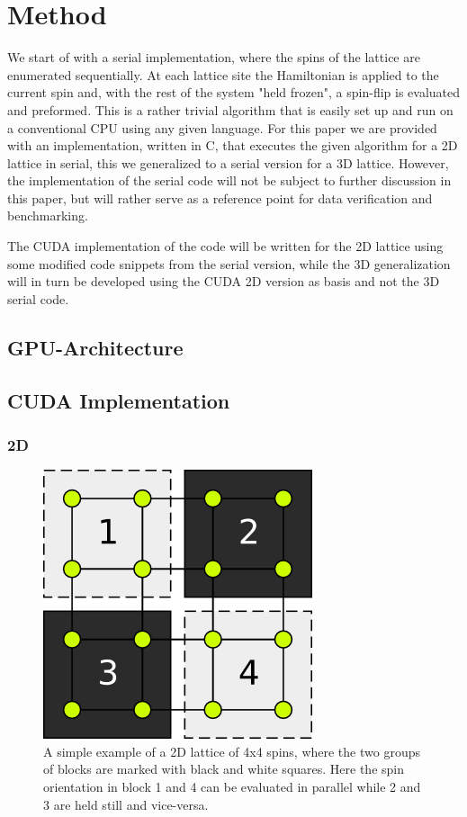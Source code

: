 \documentclass[paper=a4, fontsize=11pt]{scrartcl} %
\numberwithin{equation}{section} %
\numberwithin{figure}{section} %
\numberwithin{table}{section} %
\begin{document}
\section{Method}
\label{sec:method}
We start of with a serial implementation, where the spins of the lattice are enumerated sequentially. At each lattice site the Hamiltonian is applied to the current spin and, with the rest of the system "held frozen", a spin-flip is evaluated and preformed. This is a rather trivial algorithm that is easily set up and run on a conventional CPU using any given language. For this paper we are provided with an implementation, written in C, that executes the given algorithm for a 2D lattice in serial, this we generalized to a serial version for a 3D lattice. However, the implementation of the serial code will not be subject to further discussion in this paper, but will rather serve as a reference point for data verification and benchmarking.

The CUDA implementation of the code will be written for the 2D lattice using some modified code snippets from the serial version, while the 3D generalization will in turn be developed using the CUDA 2D version as basis and not the 3D serial code.

\subsection{GPU-Architecture}

\subsection{CUDA Implementation}

\subsubsection{2D}
\begin{figure}[hbtp]
\centering
\includegraphics[scale=0.7]{images/4x4.png}
\caption{A simple example of a 2D lattice of 4x4 spins, where the two groups of blocks are marked with black and white squares. Here the spin orientation in block 1 and 4 can be evaluated in parallel while 2 and 3 are held still and vice-versa.}
\label{fig:4x4}
\end{figure}
\end{document}

